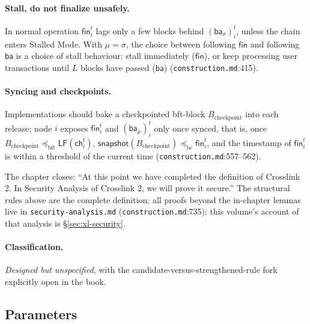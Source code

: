 \documentclass[11pt,a4paper]{article}
\theoremstyle{definition}
\begin{document}
\paragraph{Stall, do not finalize unsafely.} In normal operation
$\mathsf{fin}_i^t$ lags only a few blocks behind
$(\mathsf{ba}_{\sigma})_i^t$, unless the chain enters Stalled Mode. With
$\mu = \sigma$, the choice between following $\mathsf{fin}$ and following
$\mathsf{ba}$ is a choice of stall behaviour: stall immediately
($\mathsf{fin}$), or keep processing user transactions until $L$ blocks
have passed ($\mathsf{ba}$) (\texttt{construction.md}:415).

\paragraph{Syncing and checkpoints.} Implementations should bake a
checkpointed bft-block $B_{\mathrm{checkpoint}}$ into each release; node
$i$ exposes $\mathsf{fin}_i^t$ and $(\mathsf{ba}_{\mu})_i^t$ only once
synced, that is, once $B_{\mathrm{checkpoint}} \preceq_{\mathrm{bft}}
\mathsf{LF}(\mathsf{ch}_i^t)$,
$\mathsf{snapshot}(B_{\mathrm{checkpoint}}) \preceq_{\mathrm{bc}}
\mathsf{fin}_i^t$, and the timestamp of $\mathsf{fin}_i^t$ is within a
threshold of the current time (\texttt{construction.md}:557--562).

The chapter closes: ``At this point we have completed the definition of
Crosslink 2. In Security Analysis of Crosslink 2, we will prove it
secure.'' The structural rules above are the complete definition; all
proofs beyond the in-chapter lemmas live in
\texttt{security-analysis.md} (\texttt{construction.md}:735); this
volume's account of that analysis is \S\ref{sec:xl-security}.

\paragraph{Classification.} \emph{Designed but unspecified}, with the
candidate-versus-strengthened-rule fork explicitly open in the book.

\subsection{Parameters}\label{sec:xl-parameters}
\end{document}
